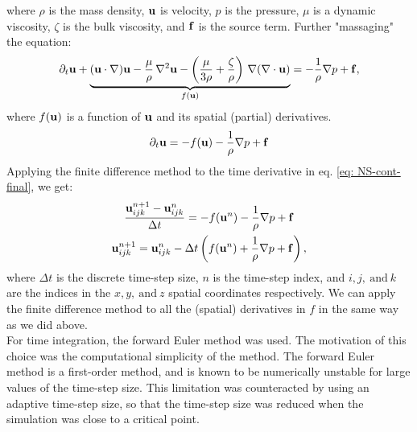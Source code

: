 where $\rho$ is the mass density, $\mathbf{u}$ is velocity, $p$ is the pressure, $\mu$ is a dynamic viscosity, $\zeta$ is the bulk viscosity, and $\mathbf{f}$ is the source term.
Further "massaging" the equation:
\begin{gather}
    \partial_t \mathbf{u} + \underbrace{(\mathbf {u} \cdot \nabla) \mathbf{u} -\frac{\mu}{\rho} \,\nabla ^{2}\mathbf{u}-\left(\frac{\mu}{3\rho} +\frac{\zeta}{\rho} \right)\,\nabla (\nabla \cdot \mathbf{u})}_{f\left(\mathbf{u}\right)} =-{\frac {1}{\rho }}\nabla p + \mathbf{f} ,
\end{gather}
where $f(\mathbf{u})$ is a function of $\mathbf{u}$ and its spatial (partial) derivatives.
\begin{gather}
    \partial_t \mathbf{u}  = -f(\mathbf{u}) -{\frac {1}{\rho }}\nabla p +\mathbf{f} \label{eq: NS-cont-final}
\end{gather}
Applying the finite difference method %
to the time derivative in eq. \ref{eq: NS-cont-final}, we get:
\begin{gather}
    \frac{\mathbf{u}_{ijk}^{n+1} - \mathbf{u}_{ijk}^n}{\Delta t} = -f(\mathbf{u}^n) -{\frac {1}{\rho }}\nabla p+\mathbf{f} \\
    \mathbf{u}_{ijk}^{n+1} = \mathbf{u}_{ijk}^n - \Delta t \left(f(\mathbf{u}^n) + {\frac {1}{\rho }}\nabla p + \mathbf{f}\right), \label{eq: NS-fd}
\end{gather}
where $\Delta t$ is the discrete time-step size, $n$ is the time-step index, and $i,j,~\text{and}~k$ are the indices in the $x,y,~\text{and}~z$ spatial coordinates respectively. We can apply the finite difference method to all the (spatial) derivatives in $f$ in the same way as we did above. \\

For time integration, the forward Euler method %
was used. The motivation of this choice was the computational simplicity of the method. The forward Euler method is a first-order method, and is known to be numerically unstable %
for large values of the time-step size. This limitation was counteracted by using an adaptive time-step size, so that the time-step size was reduced when the simulation was close to a critical point.
